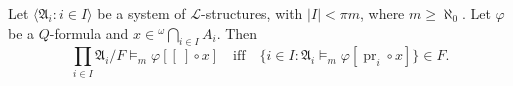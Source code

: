 Let $\langle \mathfrak{A}_i : i \in I \rangle$ be a system of $\mathcal{L}$-structures, with $|I| < \pi m$, where $m \geq \aleph_0$. Let $\varphi$ be a $Q$-formula and $x \in {}^\omega \bigcap_{i \in I} A_i$. Then
$$\prod_{i \in I} \mathfrak{A}_i / F \models_m \varphi[[\ ] \circ x] \quad \text{iff} \quad \{i \in I : \mathfrak{A}_i \models_m \varphi[\operatorname{pr}_i \circ x]\} \in F.$$
